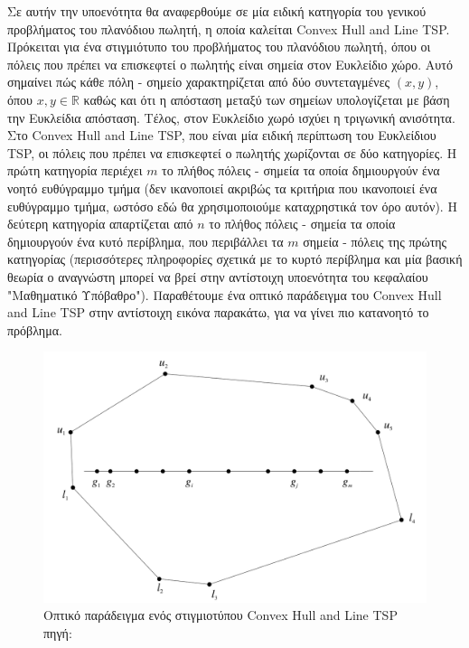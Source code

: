 \documentclass[oneside,12pt]{book}
\newcommand{\R}{\mathbb{R}}
\newenvironment{matlab}
	{\begin{figure}[hp]\centering\captionsetup{justification=centering}}
	{\end{figure}}
\theoremstyle{definition}
\begin{document}
Σε αυτήν την υποενότητα θα αναφερθούμε σε μία ειδική κατηγορία του γενικού προβλήματος του πλανόδιου πωλητή, η οποία καλείται Convex Hull and Line TSP. \\

Πρόκειται για ένα στιγμιότυπο του προβλήματος του πλανόδιου πωλητή, όπου οι πόλεις που πρέπει να επισκεφτεί ο πωλητής είναι σημεία στον Ευκλείδιο χώρο. Αυτό σημαίνει πώς κάθε πόλη - σημείο χαρακτηρίζεται από δύο συντεταγμένες \((x,y)\), όπου \(x,y \in \R\) καθώς και ότι η απόσταση μεταξύ των σημείων υπολογίζεται με βάση την Ευκλείδια απόσταση. Τέλος, στον Ευκλείδιο χωρό ισχύει η τριγωνική ανισότητα. \\

Στο Convex Hull and Line TSP, που είναι μία ειδική περίπτωση του Ευκλείδιου TSP, οι πόλεις που πρέπει να επισκεφτεί ο πωλητής χωρίζονται σε δύο κατηγορίες. Η πρώτη κατηγορία περιέχει \(m\) το πλήθος πόλεις - σημεία τα οποία δημιουργούν ένα νοητό ευθύγραμμο τμήμα (δεν ικανοποιεί ακριβώς τα κριτήρια που ικανοποιεί ένα ευθύγραμμο τμήμα, ωστόσο εδώ θα χρησιμοποιούμε καταχρηστικά τον όρο αυτόν). Η δεύτερη κατηγορία απαρτίζεται από \(n\) το πλήθος πόλεις - σημεία τα οποία δημιουργούν ένα κυτό περίβλημα, που περιβάλλει τα \(m\) σημεία - πόλεις της πρώτης κατηγορίας (περισσότερες πληροφορίες σχετικά με το κυρτό περίβλημα και μία βασική θεωρία ο αναγνώστη μπορεί να βρεί στην αντίστοιχη υποενότητα του κεφαλαίου "Μαθηματικό Υπόβαθρο"). Παραθέτουμε ένα οπτικό παράδειγμα του Convex Hull and Line TSP στην αντίστοιχη εικόνα παρακάτω, για να γίνει πιο κατανοητό το πρόβλημα. \\

\begin{matlab}
	\includegraphics[scale=0.3]{images/ConvexHullLineTSP1.png}
	\caption{Οπτικό παράδειγμα ενός στιγμιοτύπου Convex Hull and Line TSP \\ πηγή: \cite{17}}
\end{matlab}
\end{document}
